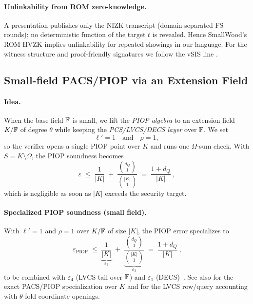 \paragraph{Unlinkability from ROM zero-knowledge.}
A presentation publishes only the NIZK transcript (domain-separated FS rounds); no deterministic function of the target $t$ is revealed. Hence SmallWood’s ROM HVZK implies unlinkability for repeated showings in our language. For the witness structure and proof-friendly signatures we follow the vSIS line \cite{cryptoeprint:2025/356}.


\subsection{Small-field PACS/PIOP via an Extension Field}\label{subsec:smallfield}

\paragraph{Idea.}
When the base field \(\mathbb{F}\) is small, we lift the \emph{PIOP algebra} to an extension field \(K/\mathbb{F}\) of degree \(\theta\) while keeping the \emph{PCS/LVCS/DECS layer} over \(\mathbb{F}\).
We set
\[
\ell' = 1 \quad\text{and}\quad \rho = 1,
\]
so the verifier opens a single PIOP point over \(K\) and runs one \(\Omega\)-sum check. With \(S = K\setminus\Omega\), the PIOP soundness becomes
\[
\varepsilon \;\le\; \frac{1}{|K|} \;+\; \frac{\binom{d_Q}{1}}{\binom{|K|}{1}}
\;=\; \frac{1+d_Q}{|K|}\,,
\]
which is negligible as soon as \(|K|\) exceeds the security target.

\paragraph{Specialized PIOP soundness (small field).}
With $\ell'=1$ and $\rho=1$ over $K/\mathbb{F}$ of size $|K|$, the PIOP error specializes to
\[
\boxed{\ \varepsilon_{\mathrm{PIOP}} \;\le\; \underbrace{\frac{1}{|K|}}_{\varepsilon_2}\;+\;\underbrace{\frac{\binom{d_Q}{1}}{\binom{|K|}{1}}}_{\varepsilon_3}\;=\;\frac{1+d_Q}{|K|}\ }\!,
\]
to be combined with $\varepsilon_4$ (LVCS tail over $\mathbb{F}$) and $\varepsilon_1$ (DECS)~\cite{cryptoeprint:2025/1085}. See also \cite[§5.4]{cryptoeprint:2025/1085} for the exact PACS/PIOP specialization over $K$ and \cite[Tab.~2]{cryptoeprint:2025/1085} for the LVCS row/query accounting with $\theta$-fold coordinate openings.


